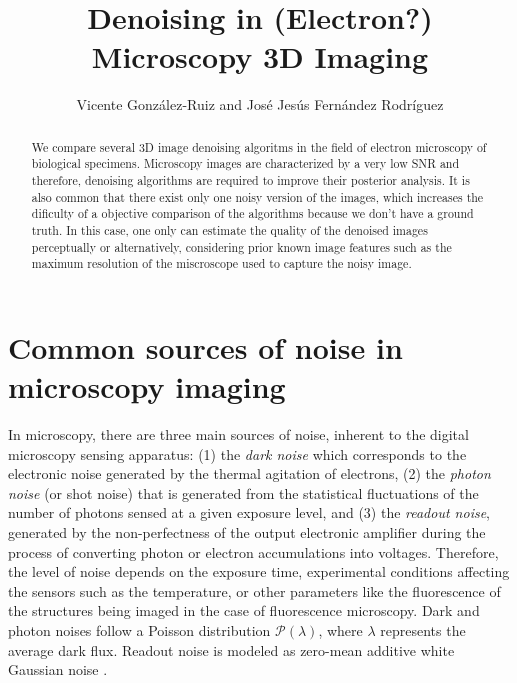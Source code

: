 \documentclass{article}
\title{Denoising in (Electron?) Microscopy 3D Imaging}
\author{Vicente González-Ruiz and José Jesús Fernández Rodríguez}
\begin{document}
\maketitle

\begin{abstract}
  We compare several 3D image denoising algoritms in the field of
  electron microscopy of biological specimens. Microscopy images are
  characterized by a very low SNR and therefore, denoising algorithms
  are required to improve their posterior analysis. It is also common
  that there exist only one noisy version of the images, which
  increases the dificulty of a objective comparison of the algorithms
  because we don't have a ground truth. In this case, one only can
  estimate the quality of the denoised images perceptually or
  alternatively, considering prior known image features such as the
  maximum resolution of the miscroscope used to capture the noisy
  image.
\end{abstract}

\tableofcontents

\section{Common sources of noise in microscopy imaging}

In microscopy, there are three main sources of noise, inherent to the
digital microscopy sensing apparatus: (1) the \emph{dark noise} which
corresponds to the electronic noise generated by the thermal agitation
of electrons, (2) the \emph{photon noise} (or shot noise) that is
generated from the statistical fluctuations of the number of photons
sensed at a given exposure level, and (3) the \emph{readout noise},
generated by the non-perfectness of the output electronic amplifier
during the process of converting photon or electron accumulations into
voltages. Therefore, the level of noise depends on the exposure time,
experimental conditions affecting the sensors such as the temperature,
or other parameters like the fluorescence of the structures being
imaged in the case of fluorescence microscopy. Dark and photon noises
follow a Poisson distribution $\mathcal{P}(\lambda)$, where $\lambda$
represents the average dark flux. Readout noise is modeled as
zero-mean additive white Gaussian noise
\cite{meiniel2018denoising,zhou2020wirtinger}.
\end{document}

